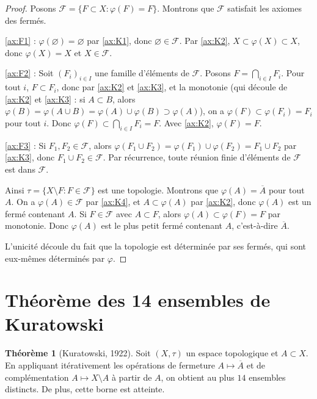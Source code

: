 \documentclass[12pt,a4paper,openany]{book}
\theoremstyle{definition}
\theoremstyle{cours}
\newtheorem{theoreme}{Théorème}[chapter]
\theoremstyle{coursnormal}
\newcommand{\Cl}[1]{\overline{#1}}
\begin{document}
\begin{proof}
  Posons $\mathcal{F} = \{F \subset X : \varphi(F) = F\}$. Montrons que $\mathcal{F}$ satisfait les axiomes des fermés.

  \ref{ax:F1} : $\varphi(\varnothing) = \varnothing$ par \ref{ax:K1}, donc $\varnothing \in \mathcal{F}$. Par \ref{ax:K2}, $X \subset \varphi(X) \subset X$, donc $\varphi(X) = X$ et $X \in \mathcal{F}$.

  \ref{ax:F2} : Soit $(F_i)_{i \in I}$ une famille d'éléments de $\mathcal{F}$. Posons $F = \bigcap_{i \in I} F_i$. Pour tout $i$, $F \subset F_i$, donc par \ref{ax:K2} et \ref{ax:K3}, et la monotonie (qui découle de \ref{ax:K2} et \ref{ax:K3} : si $A \subset B$, alors $\varphi(B) = \varphi(A \cup B) = \varphi(A) \cup \varphi(B) \supset \varphi(A)$), on a $\varphi(F) \subset \varphi(F_i) = F_i$ pour tout $i$. Donc $\varphi(F) \subset \bigcap_{i \in I} F_i = F$. Avec \ref{ax:K2}, $\varphi(F) = F$.

  \ref{ax:F3} : Si $F_1, F_2 \in \mathcal{F}$, alors $\varphi(F_1 \cup F_2) = \varphi(F_1) \cup \varphi(F_2) = F_1 \cup F_2$ par \ref{ax:K3}, donc $F_1 \cup F_2 \in \mathcal{F}$. Par récurrence, toute réunion finie d'éléments de $\mathcal{F}$ est dans $\mathcal{F}$.

  Ainsi $\tau = \{X \setminus F : F \in \mathcal{F}\}$ est une topologie. Montrons que $\varphi(A) = \Cl{A}$ pour tout $A$. On a $\varphi(A) \in \mathcal{F}$ par \ref{ax:K4}, et $A \subset \varphi(A)$ par \ref{ax:K2}, donc $\varphi(A)$ est un fermé contenant $A$. Si $F \in \mathcal{F}$ avec $A \subset F$, alors $\varphi(A) \subset \varphi(F) = F$ par monotonie. Donc $\varphi(A)$ est le plus petit fermé contenant $A$, c'est-à-dire $\Cl{A}$.

  L'unicité découle du fait que la topologie est déterminée par ses fermés, qui sont eux-mêmes déterminés par $\varphi$.
\end{proof}

\section{Théorème des 14 ensembles de Kuratowski}
\label{sec:kuratowski-14}


\begin{theoreme}[Kuratowski, 1922]\label{thm:kuratowski-14}
  Soit $(X,\tau)$ un espace topologique et $A \subset X$. En appliquant itérativement les opérations de fermeture $A \mapsto \Cl{A}$ et de complémentation $A \mapsto X \setminus A$ à partir de $A$, on obtient au plus $14$ ensembles distincts. De plus, cette borne est atteinte.
\end{theoreme}
\end{document}
